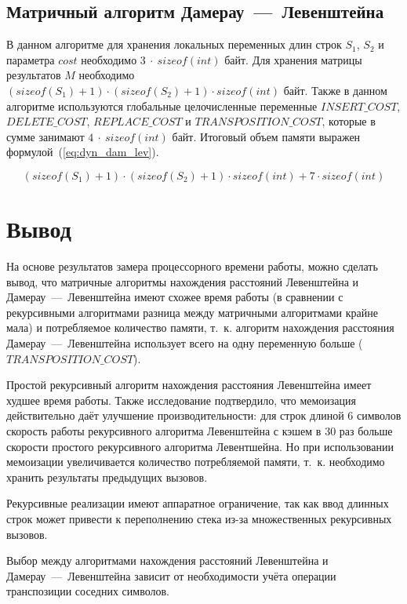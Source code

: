 \subsection{Матричный алгоритм Дамерау~---~Левенштейна}

В данном алгоритме для хранения локальных переменных длин строк $S_1$, $S_2$ и параметра $cost$ необходимо $3~\cdot~sizeof(int)$ байт. Для хранения матрицы результатов $M$ необходимо $(sizeof(S_1) + 1) \cdot (sizeof(S_2) + 1) \cdot sizeof(int)$ байт. Также в данном алгоритме используются глобальные целочисленные переменные $INSERT\_COST$, $DELETE\_COST$, $REPLACE\_COST$ и $TRANSPOSITION\_COST$, которые в сумме занимают $4~\cdot~sizeof(int)$ байт. Итоговый объем памяти выражен формулой~(\ref{eq:dyn_dam_lev}).

\begin{equation}
    \label{eq:dyn_dam_lev}
    (sizeof(S_1) + 1) \cdot (sizeof(S_2) + 1) \cdot sizeof(int) + 7 \cdot sizeof(int)
\end{equation}

\section{Вывод}

На основе результатов замера процессорного времени работы, можно сделать вывод, что матричные алгоритмы нахождения расстояний Левенштейна и Дамерау~---~Левенштейна имеют схожее время работы (в сравнении с рекурсивными алгоритмами разница между матричными алгоритмами крайне мала) и потребляемое количество памяти, т.~к. алгоритм нахождения расстояния Дамерау~---~Левенштейна использует всего на одну переменную больше ($TRANSPOSITION\_COST$). 

Простой рекурсивный алгоритм нахождения расстояния Левенштейна имеет худшее время работы. Также исследование подтвердило, что мемоизация действительно даёт улучшение производительности: для строк длиной 6 символов скорость работы рекурсивного алгоритма Левенштейна с кэшем в 30 раз больше скорости простого рекурсивного алгоритма Левентшейна. Но при использовании мемоизации увеличивается количество потребляемой памяти, т.~к. необходимо хранить результаты предыдущих вызовов. 

 Рекурсивные реализации имеют аппаратное ограничение, так как ввод длинных строк может привести к переполнению стека из-за множественных рекурсивных вызовов.

Выбор между алгоритмами нахождения расстояний Левенштейна и Дамерау~---~Левенштейна зависит от необходимости учёта операции транспозиции соседних символов.